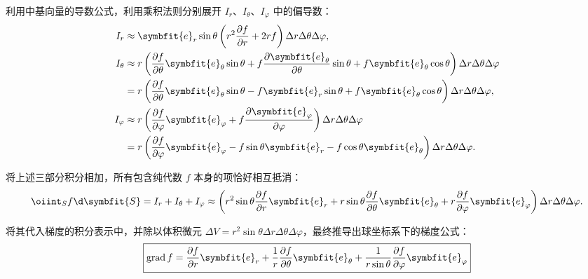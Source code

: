 \begin{solution}
    利用中基向量的导数公式，利用乘积法则分别展开 $I_r$、$I_\theta$、$I_\varphi$ 中的偏导数：
    \begin{equation}
        \begin{aligned}
            I_r       & \approx \symbfit{e}_r \sin\theta \left( r^2 \frac{\partial f}{\partial r} + 2r f \right) \Delta r \Delta \theta \Delta \varphi,                                                                                                      \\
            I_\theta  & \approx r \left( \frac{\partial f}{\partial \theta} \symbfit{e}_\theta \sin\theta + f \frac{\partial \symbfit{e}_\theta}{\partial \theta} \sin\theta + f \symbfit{e}_\theta \cos\theta \right) \Delta r \Delta \theta \Delta \varphi \\
                      & = r \left( \frac{\partial f}{\partial \theta} \symbfit{e}_\theta \sin\theta - f \symbfit{e}_r \sin\theta + f \symbfit{e}_\theta \cos\theta \right) \Delta r \Delta \theta \Delta \varphi,                                            \\
            I_\varphi & \approx r \left( \frac{\partial f}{\partial \varphi} \symbfit{e}_\varphi + f \frac{\partial \symbfit{e}_\varphi}{\partial \varphi} \right) \Delta r \Delta \theta \Delta \varphi                                                     \\
                      & = r \left( \frac{\partial f}{\partial \varphi} \symbfit{e}_\varphi - f \sin\theta \symbfit{e}_r - f \cos\theta \symbfit{e}_\theta \right) \Delta r \Delta \theta \Delta \varphi.
        \end{aligned}
    \end{equation}

    将上述三部分积分相加，所有包含纯代数 $f$ 本身的项恰好相互抵消：
    \begin{equation}
        \oiint_{S} f \d \symbfit{S} = I_r + I_\theta + I_\varphi \approx \left( r^2 \sin\theta \frac{\partial f}{\partial r} \symbfit{e}_r + r \sin\theta \frac{\partial f}{\partial \theta} \symbfit{e}_\theta + r \frac{\partial f}{\partial \varphi} \symbfit{e}_\varphi \right) \Delta r \Delta \theta \Delta \varphi.
    \end{equation}

    将其代入梯度的积分表示中，并除以体积微元 $\Delta V = r^2 \sin\theta \Delta r \Delta \theta \Delta \varphi$，最终推导出球坐标系下的梯度公式：
    \begin{equation}
        \boxed{\operatorname{grad} f = \frac{\partial f}{\partial r} \symbfit{e}_r + \frac{1}{r} \frac{\partial f}{\partial \theta} \symbfit{e}_\theta + \frac{1}{r \sin\theta} \frac{\partial f}{\partial \varphi} \symbfit{e}_\varphi}
    \end{equation}
\end{solution}


